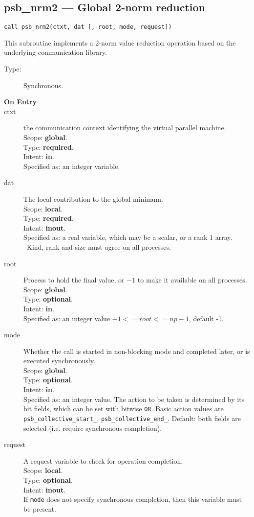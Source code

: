 \clearpage\subsection{psb\_nrm2 --- Global 2-norm reduction}

\begin{verbatim}
call psb_nrm2(ctxt, dat [, root, mode, request])
\end{verbatim}

This subroutine implements a 2-norm value reduction 
operation based on the underlying communication library. 
\begin{description}
\item[Type:] Synchronous.
\item[\bf  On Entry ]
\item[ctxt] the communication context identifying the virtual
  parallel machine.\\
Scope: {\bf global}.\\
Type: {\bf required}.\\
Intent: {\bf in}.\\
Specified as: an integer variable.
\item[dat] The local contribution to the global minimum.\\
Scope: {\bf local}.\\
Type: {\bf required}.\\
Intent: {\bf inout}.\\
Specified as: a real variable, which may be a
scalar, or a rank 1 array. \
Kind, rank and size must agree on all processes.
\item[root] Process to hold the final value, or $-1$ to make it available
  on all processes.\\
Scope: {\bf global}.\\
Type: {\bf optional}.\\
Intent: {\bf in}.\\
Specified as: an integer value $-1<= root <= np-1$, default -1. \\
\item[mode] Whether the call is started in non-blocking mode and completed
  later, or is executed synchronously.\\
Scope: {\bf global}.\\
Type: {\bf optional}.\\
Intent: {\bf in}.\\
Specified as: an integer value. The action to be taken is determined
by its bit fields, which can be set with bitwise \verb|OR|. Basic
action values are \verb|psb_collective_start_|, \verb|psb_collective_end_|.
Default:  both fields are selected (i.e. require synchronous completion).\\
\item[request] A request variable to check for operation completion.\\
Scope: {\bf local}.\\
Type: {\bf optional}.\\
Intent: {\bf inout}.\\
If \verb|mode| does not specify synchronous completion, then this
variable must be present.
\end{description}


